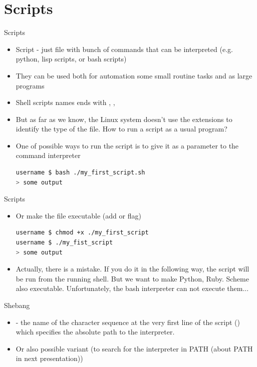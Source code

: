 \documentclass[usenames,dvipsnames,10pt,aspectratio=169]{beamer}
\begin{document}
\section{Scripts}

\begin{frame}[fragile]{Scripts}
    \begin{itemize}
        \item Script - just file with bunch of commands that can be interpreted (e.g. python, lisp scripts, or bash scripts)
        \item They can be used both for automation some small routine tasks and as large programs
        \item Shell scripts names ends with , , 
        \item But as far as we know, the Linux system doesn't use the extensions to identify the type of the file. How to run a script as a usual program?
        \item One of possible ways to run the script is to give it as a parameter to the command interpreter
        \begin{lstlisting}[language=bash, style=shellstyle]
username $ bash ./my_first_script.sh
> some output
        \end{lstlisting}
    \end{itemize}
\end{frame}

\begin{frame}[fragile]{Scripts}
    \begin{itemize}
        \item Or make the file executable (add  or  flag)
        \begin{lstlisting}[language=bash, style=shellstyle]
username $ chmod +x ./my_first_script
username $ ./my_fist_script
> some output
        \end{lstlisting}
        \item Actually, there is a mistake. If you do it in the following way, the script will be run from the running shell. But we want to make Python, Ruby. Scheme also executable. Unfortunately, the bash interpreter can not execute them...
    \end{itemize}
\end{frame}

\begin{frame}{Shebang}
    \begin{itemize}
        \item {} - the name of the character sequence at the very first line of the script () which specifies the absolute path to the interpreter.
        
        \item Or also possible variant (to search for the interpreter in PATH (about PATH in next presentation))
        
    \end{itemize}
\end{frame}
\end{document}
